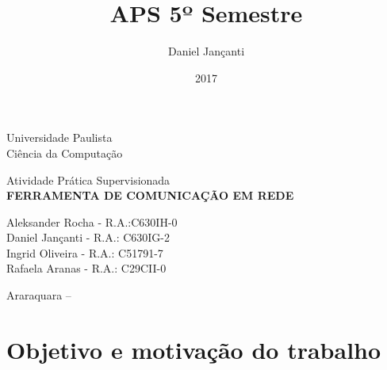 \documentclass[12pt, a4paper]{article}
\title{APS 5º Semestre}
\author{Daniel Jançanti}
\date{2017}
\begin{document}
	\begin{center}
		\Huge Universidade Paulista\\
		\large Ciência da Computação
		
		\vfill
		
		\large Atividade Prática Supervisionada\\
		\textbf{\MakeUppercase{Ferramenta de comunicação em rede}}
		
		\bigskip
		\bigskip
		
		\normalsize{
			Aleksander Rocha - R.A.:C630IH-0\\
			Daniel Jançanti - R.A.: C630IG-2\\
			Ingrid Oliveira - R.A.: C51791-7\\
			Rafaela Aranas - R.A.: C29CII-0\\	
		}
		
		\vfill
		
		Araraquara -- \the\year
		
	\end{center}
	
	\thispagestyle{empty}
	
	\newpage
	\tableofcontents
	\thispagestyle{empty}
	
	\newpage
	\section{Objetivo e motivação do trabalho}
	\lipsum[1]
\end{document}
